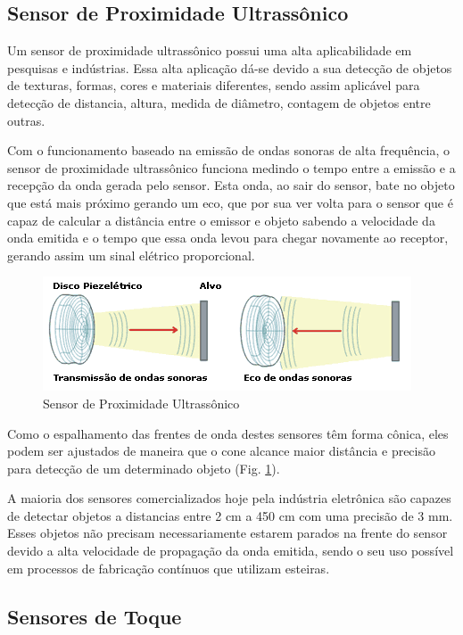 \begin{anexosenv}
\subsection[Sensor de Proximidade Ultrassônico]{Sensor de Proximidade Ultrassônico}

Um sensor de proximidade ultrassônico possui uma alta aplicabilidade em pesquisas e indústrias. Essa alta aplicação dá-se devido a sua detecção de objetos de texturas, formas, cores e materiais diferentes, sendo assim aplicável para detecção de distancia, altura, medida de diâmetro, contagem de objetos entre outras.

Com o funcionamento baseado na emissão de ondas sonoras de alta frequência, o sensor de proximidade ultrassônico funciona medindo o tempo entre a emissão e a recepção da onda gerada pelo sensor. Esta onda, ao sair do sensor, bate no objeto que está mais próximo gerando um eco, que por sua ver volta para o sensor que é capaz de calcular a distância entre o emissor e objeto sabendo a velocidade da onda emitida e o tempo que essa onda levou para chegar novamente ao receptor, gerando assim um sinal elétrico proporcional.

\begin{figure}[htb]
		\centering
		\includegraphics[scale=0.7]{figuras/sensorultra.png}
		\caption{Sensor de Proximidade Ultrassônico}
		\label{fig11}
\end{figure}

Como o espalhamento das frentes de onda destes sensores têm forma cônica, eles podem ser ajustados de maneira que o cone alcance maior distância e precisão para detecção de um determinado objeto (Fig. \ref{fig11}).

A maioria dos sensores comercializados hoje pela indústria eletrônica são capazes de detectar objetos a distancias entre 2 cm a 450 cm com uma precisão de 3 mm. Esses objetos não precisam necessariamente estarem parados na frente do sensor devido a alta velocidade de propagação da onda emitida, sendo o seu uso possível em processos de fabricação contínuos que utilizam esteiras.
 
\subsection[Sensor de Toque]{Sensores de Toque}


\end{anexosenv}
